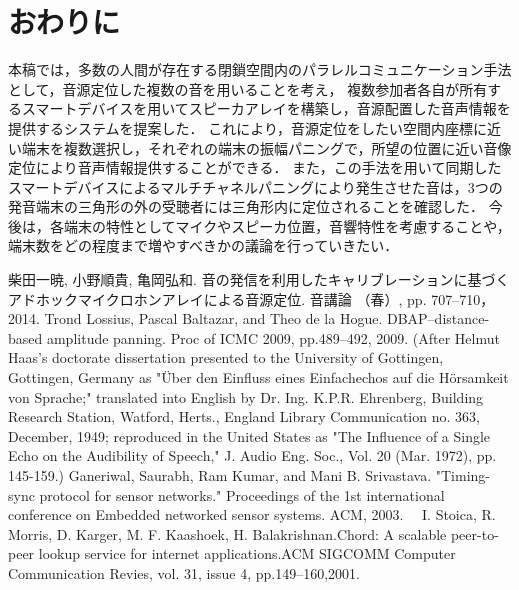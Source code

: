 \documentclass[11pt]{jarticle}
\begin{document}
\section{おわりに}
本稿では，多数の人間が存在する閉鎖空間内のパラレルコミュニケーション手法として，音源定位した複数の音を用いることを考え，
複数参加者各自が所有するスマートデバイスを用いてスピーカアレイを構築し，音源配置した音声情報を提供するシステムを提案した．
これにより，音源定位をしたい空間内座標に近い端末を複数選択し，それぞれの端末の振幅パニングで，所望の位置に近い音像定位により音声情報提供することができる．
また，この手法を用いて同期したスマートデバイスによるマルチチャネルパニングにより発生させた音は，3つの発音端末の三角形の外の受聴者には三角形内に定位されることを確認した．
今後は，各端末の特性としてマイクやスピーカ位置，音響特性を考慮することや，端末数をどの程度まで増やすべきかの議論を行っていきたい．


\begin{thebibliography}{10}

 柴田一暁, 小野順貴, 亀岡弘和. 音の発信を利用したキャリブレーションに基づくアドホックマイクロホンアレイによる音源定位. 音講論 （春）, pp. 707--710，2014.
      Trond Lossius, Pascal Baltazar, and Theo de la Hogue. DBAP–distance-based amplitude panning. Proc of ICMC 2009, pp.489--492, 2009.
      (After Helmut Haas's doctorate dissertation presented to the University of Gottingen, Gottingen, Germany as "Über den Einfluss eines Einfachechos auf die Hörsamkeit von Sprache;" translated into English by Dr. Ing. K.P.R. Ehrenberg, Building Research Station, Watford, Herts., England Library Communication no. 363, December, 1949; reproduced in the United States as "The Influence of a Single Echo on the Audibility of Speech," J. Audio Eng. Soc., Vol. 20 (Mar. 1972), pp. 145-159.)
      Ganeriwal, Saurabh, Ram Kumar, and Mani B. Srivastava. "Timing-sync protocol for sensor networks." Proceedings of the 1st international conference on Embedded networked sensor systems. ACM, 2003.
　I. Stoica, R. Morris, D. Karger, M. F. Kaashoek, H. Balakrishnan.Chord: A scalable peer-to-peer lookup service for internet applications.ACM SIGCOMM Computer Communication Revies, vol. 31, issue 4, pp.149--160,2001.

\end{thebibliography}
\end{document}

